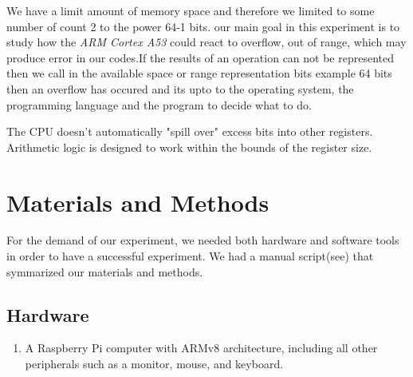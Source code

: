 We have a limit amount of memory space and therefore we limited to some number of count 2 to the power 64-1 bits. 
our main goal in this experiment is to study how the \textit{ARM Cortex A53} could react to overflow, out of range, 
which may produce error in our codes.If the results of an operation can not be represented then we call in the 
available space or range representation bits example 64 bits then an overflow has occured and its upto to the operating system, the programming 
language and the program to decide what to do.

The CPU doesn’t automatically "spill over" excess bits into other registers. 
Arithmetic logic is designed to work within the bounds of the register size.







\newpage
\section*{Materials and Methods}
For the demand of our experiment, we needed both hardware and software tools in order to have a successful experiment. We had a manual script(see\cite{comp_tech_script}) that 
symmarized our materials and methods.
\subsection*{Hardware}
\begin{enumerate}[label=\arabic*.]
    \item A Raspberry Pi computer with ARMv8 architecture, including all other peripherals such as a monitor, mouse, and keyboard.
\end{enumerate}

